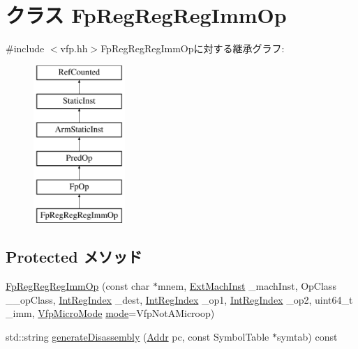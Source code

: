 \hypertarget{classArmISA_1_1FpRegRegRegImmOp}{
\section{クラス FpRegRegRegImmOp}
\label{classArmISA_1_1FpRegRegRegImmOp}
}


{\ttfamily \#include $<$vfp.hh$>$}FpRegRegRegImmOpに対する継承グラフ:\begin{figure}[H]
\begin{center}
\leavevmode
\includegraphics[height=6cm]{classArmISA_1_1FpRegRegRegImmOp}
\end{center}
\end{figure}
\subsection*{Protected メソッド}
\begin{DoxyCompactItemize}
\item 
\hyperlink{classArmISA_1_1FpRegRegRegImmOp_a742b4705a73315a904eeb1c010839fb8}{FpRegRegRegImmOp} (const char $\ast$mnem, \hyperlink{classStaticInst_a5605d4fc727eae9e595325c90c0ec108}{ExtMachInst} \_\-machInst, OpClass \_\-\_\-opClass, \hyperlink{namespaceArmISA_ae64680ba9fb526106829d6bf92fc791b}{IntRegIndex} \_\-dest, \hyperlink{namespaceArmISA_ae64680ba9fb526106829d6bf92fc791b}{IntRegIndex} \_\-op1, \hyperlink{namespaceArmISA_ae64680ba9fb526106829d6bf92fc791b}{IntRegIndex} \_\-op2, uint64\_\-t \_\-imm, \hyperlink{namespaceArmISA_ad386ea556acd7cd538c64e2d73933714}{VfpMicroMode} \hyperlink{namespaceArmISA_a5f3b9b97eb2dfa29d33e74878455f90d}{mode}=VfpNotAMicroop)
\item 
std::string \hyperlink{classArmISA_1_1FpRegRegRegImmOp_a95d323a22a5f07e14d6b4c9385a91896}{generateDisassembly} (\hyperlink{classm5_1_1params_1_1Addr}{Addr} pc, const SymbolTable $\ast$symtab) const 
\end{DoxyCompactItemize}
